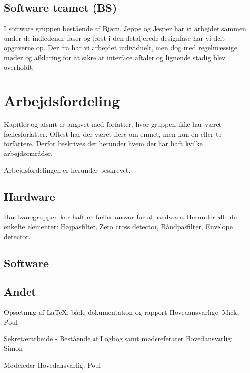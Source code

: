 \subsection{Software teamet (BS)}
I software gruppen bestående af Bjørn, Jeppe og Jesper har vi arbejdet sammen under de indledende faser og først i den detaljerede designfase har vi delt opgaverne op.
Der fra har vi arbejdet individuelt, men dog med regelmæssige møder og afklaring for at sikre at interface aftaler og lignende stadig blev overholdt.


\section{Arbejdsfordeling}
 
Kapitler og afsnit er angivet med forfatter, hvor gruppen ikke har været fællesforfatter. Oftest har der været flere om emnet, men kun én eller to forfattere. Derfor beskrives der herunder hvem der har haft hvilke arbejdsområder.  

Arbejdsfordelingen er herunder beskrevet. 

\subsection{Hardware}
Hardwaregruppen har haft en fælles ansvar for al hardware. Herunder alle de enkelte elementer: Højpasfilter, Zero cross detector, Båndpasfilter, Envelope detector.   


\subsection{Software}

\subsection{Andet}

Opsætning af \LaTeX, både dokumentation og rapport
Hovedansvarlige: Mick, Poul 

Sekretærarbejde - Bestående af Logbog samt mødereferater
Hovedansvarlig: Simon

Mødeleder
Hovedansvarlig: Poul




